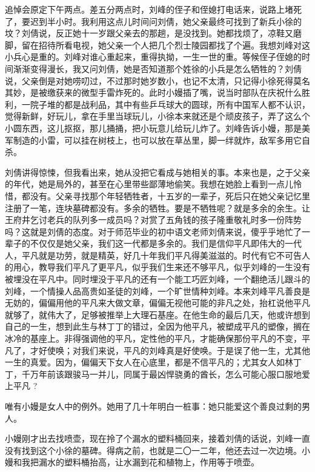 \documentclass[12pt,twoside,openany]{book}
\begin{document}
追悼会原定下午两点。差五分两点时，刘峰的侄子和侄媳打电话来，说路上堵死了，要迟到半小时。我利用这点儿时间问刘倩，她父亲最终可找到了新兵小徐的坟？刘倩说，反正她十一岁跟父亲去的那趟，是没找到。她都找烦了，凉鞋又磨脚，留在招待所看电视，她父亲一个人把几个烈士陵园都找了个遍。我想刘峰对这小兵心是重的。刘峰对谁心重起来，重得执拗，一生一世的重。等候侄子侄媳的时间渐渐变得漫长，我又问刘倩，她是否知道那个姓徐的小兵是怎么牺牲的？刘倩说，父亲倒是对她唠叨过，不过那时她岁数小，也记不太清，只记得小徐死得莫名其妙，是被缴获来的微型手雷炸死的。此时小嫚插了嘴，说当时部队在庆祝什么胜利，一院子堆的都是战利品，其中有些乒乓球大的圆球，所有中国军人都不认识，觉得新鲜，好玩儿，拿在手里当球玩儿，小徐本来就还是个顽皮孩子，弄了这么个小圆东西，这儿抠抠，那儿捅捅，把小玩意儿给玩儿炸了。刘峰告诉小嫚，那是美军制造的小雷，可以挂在树枝上，也可以放在草丛里，脚一绊就炸，敌军多用它自杀。

刘倩讲得惊悚，但我看出来，她从没把它看成与她相关的事。本来也是，之于父亲的年代，她是局外的，甚至在心里带些鄙薄地偷笑。我想在她脸上看到一点儿怜惜，都没有。父亲寻找那个年轻牺牲者，十五岁的一辈子，死后只在她父亲记忆里注册了一笔，连块墓碑都没有。多余的牺牲。要是不牺牲呢？就是多余的余生。让王府井乞讨老兵的队列多一成员吗？对赏了五角钱的孩子隆重敬礼时多一份阵势吗？这就是刘倩的态度。对于师范毕业的初中语文老师刘倩来说，傻乎乎地忙了一辈子的不仅仅是她父亲，我们这一代都是多余的。我们是信仰平凡即伟大的一代人，平凡就是功劳，就是精英，好几十年我们平凡得美滋滋的。时代有它不可告人的用心，教导我们平凡了更平凡，似乎我们生来还不够平凡，似乎刘峰的一生没有被埋没在平凡中。同时埋没于平凡的还有一个能工巧匠刘峰，一个翻绝活儿跟斗的刘峰，一个情操人品高贵如圣徒的刘峰，一个旷世情种刘峰。本来刘峰平凡善良是无妨的，偏偏用他的平凡来大做文章，偏偏无视他可能的非凡之处，抬杠说他平凡就够了，就伟大了，足够被推举上大理石基座。在他生命的最后几天，他或许想到自己的一生，想到此生与林丁丁的错过，全因为他平凡，被塑成平凡的塑像，搁在冰冷的基座上。非得强调他的平凡，定性他的平凡，才能确保那份平凡的不变，平凡了，才好使唤；对我们来说，平凡的刘峰真是好使唤。于是误了他一生，尤其他一生的真爱。因为，偏偏天下女人在心底里，都是不信平凡的；尤其女人如林丁丁，千万年前该跟骏马一并儿，同属于最凶悍骁勇的酋长，怎么可能心服口服地爱上平凡 ?

唯有小嫚是女人中的例外。她用了几十年明白一桩事：她只能爱这个善良过剩的男人。

小嫚刚才出去找喷壶，现在拎了个漏水的塑料桶回来，接着刘倩的话说，刘峰一直没有找到这个小徐的墓碑。得病之前，也就是二〇一二年，他还去过一次边境。小嫚和我把漏水的塑料桶抬高，让水漏到花和植物上，作用等于喷壶。
\end{document}
